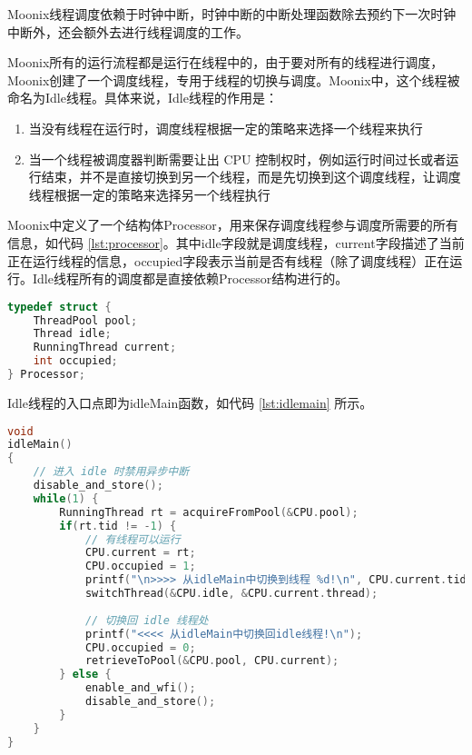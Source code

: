 Moonix线程调度依赖于时钟中断，时钟中断的中断处理函数除去预约下一次时钟中断外，还会额外去进行线程调度的工作。

Moonix所有的运行流程都是运行在线程中的，由于要对所有的线程进行调度，Moonix创建了一个调度线程，专用于线程的切换与调度。Moonix中，这个线程被命名为Idle线程。具体来说，Idle线程的作用是：

\begin{enumerate}
	\item 当没有线程在运行时，调度线程根据一定的策略来选择一个线程来执行
	\item 当一个线程被调度器判断需要让出 CPU 控制权时，例如运行时间过长或者运行结束，并不是直接切换到另一个线程，而是先切换到这个调度线程，让调度线程根据一定的策略来选择另一个线程执行
\end{enumerate}

Moonix中定义了一个结构体Processor，用来保存调度线程参与调度所需要的所有信息，如代码 \ref{lst:processor}。其中idle字段就是调度线程，current字段描述了当前正在运行线程的信息，occupied字段表示当前是否有线程（除了调度线程）正在运行。Idle线程所有的调度都是直接依赖Processor结构进行的。

\begin{minipage}[c]{0.95\textwidth}
\begin{lstlisting}[language={C}, caption={Processor结构体}, label={lst:processor}]
typedef struct {
	ThreadPool pool;
	Thread idle;
	RunningThread current;
	int occupied;
} Processor;
\end{lstlisting}
\end{minipage}

Idle线程的入口点即为idleMain函数，如代码 \ref{lst:idlemain} 所示。

\begin{minipage}[c]{0.95\textwidth}
\begin{lstlisting}[language={C}, caption={idleMain函数}, label={lst:idlemain}]
void
idleMain()
{
	// 进入 idle 时禁用异步中断
	disable_and_store();
	while(1) {
		RunningThread rt = acquireFromPool(&CPU.pool);
		if(rt.tid != -1) {
			// 有线程可以运行
			CPU.current = rt;
			CPU.occupied = 1;
			printf("\n>>>> 从idleMain中切换到线程 %d!\n", CPU.current.tid);
			switchThread(&CPU.idle, &CPU.current.thread);
			
			// 切换回 idle 线程处
			printf("<<<< 从idleMain中切换回idle线程!\n");
			CPU.occupied = 0;
			retrieveToPool(&CPU.pool, CPU.current);
		} else {
			enable_and_wfi();
			disable_and_store();
		}
	}
}
\end{lstlisting}
\end{minipage}

